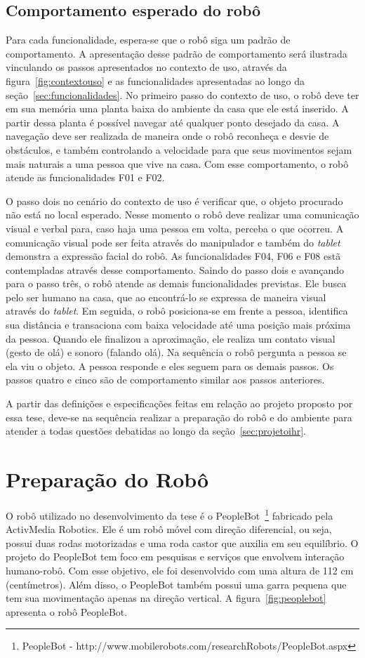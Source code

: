 \subsection{Comportamento esperado do robô}
\label{sec:comportamentoesperado}
Para cada funcionalidade, espera-se que o robô siga um padrão de comportamento. A apresentação desse padrão de comportamento será ilustrada vinculando os passos apresentados no contexto de uso, através da figura~\ref{fig:contextouso} e as funcionalidades apresentadas ao longo da seção~\ref{sec:funcionalidades}. No primeiro passo do contexto de uso, o robô deve ter em sua memória uma planta baixa do ambiente da casa que ele está inserido. A partir dessa planta é possível navegar até qualquer ponto desejado da casa. A navegação deve ser realizada de maneira onde o robô reconheça e desvie de obstáculos, e também controlando a velocidade para que seus movimentos sejam mais naturais a uma pessoa que vive na casa. Com esse comportamento, o robô atende as funcionalidades F01 e F02.

O passo dois no cenário do contexto de uso é verificar que, o objeto procurado não está no local esperado. Nesse momento o robô deve realizar uma comunicação visual e verbal para, caso haja uma pessoa em volta, perceba o que ocorreu. A comunicação visual pode ser feita através do manipulador e também do \emph{tablet} demonstra a expressão facial do robô. As funcionalidades F04, F06 e F08 estã contempladas através desse comportamento. Saindo do passo dois e avançando para o passo três, o robô atende as demais funcionalidades previstas. Ele busca pelo ser humano na casa, que ao encontrá-lo se expressa de maneira visual através do \emph{tablet}. Em seguida, o robô posiciona-se em frente a pessoa, identifica sua distância e transaciona com baixa velocidade até uma posição mais próxima da pessoa. Quando ele finalizou a aproximação, ele realiza um contato visual (gesto de olá) e sonoro (falando olá). Na sequência o robô pergunta a pessoa se ela viu o objeto. A pessoa responde e eles seguem para os demais passos. Os passos quatro e cinco são de comportamento similar aos passos anteriores.

A partir das definições e especificações feitas em relação ao projeto proposto por essa tese, deve-se na sequência realizar a preparação do robô e do ambiente para atender a todas questões debatidas ao longo da seção~\ref{sec:projetoihr}.

\section{Preparação do Robô}
\label{sec:robo}
O robô utilizado no desenvolvimento da tese é o PeopleBot~\footnote{PeopleBot - http://www.mobilerobots.com/researchRobots/PeopleBot.aspx} fabricado pela ActivMedia Robotics. Ele é um robô móvel com direção diferencial, ou seja, possui duas rodas motorizadas e uma roda castor que auxilia em seu equilíbrio. O projeto do PeopleBot tem foco em pesquisas e serviços que envolvem interação humano-robô. Com esse objetivo, ele foi desenvolvido com uma altura de 112 cm (centímetros). Além disso, o PeopleBot também possui uma garra pequena que tem sua movimentação apenas na direção vertical. A figura~\ref{fig:peoplebot} apresenta o robô PeopleBot.

